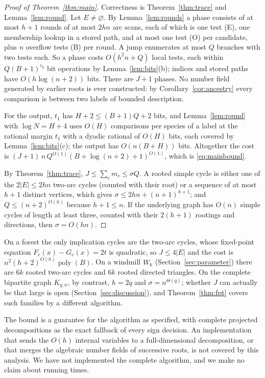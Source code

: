 \documentclass[11pt,a4paper]{article}
\theoremstyle{plain}
\theoremstyle{definition}
\theoremstyle{remark}
\newcommand{\poly}{\operatorname{poly}}
\begin{document}
\begin{proof}[Proof of Theorem~\ref{thm:main}]
Correctness is Theorem~\ref{thm:trace} and Lemma~\ref{lem:round}. Let $E\ne\varnothing$. By Lemma~\ref{lem:rounds} a phase consists of at most $h+1$ rounds of at most $2hn$ arc scans, each of which is one test (E), one membership lookup in a stored path, and at most one test (O) per candidate, plus $n$ overflow tests (B) per round. A jump enumerates at most $Q$ branches with two tests each. So a phase costs $O(h^2n+Q)$ local tests, each within $Q(B+1)^{c_0}$ bit operations by Lemma~\ref{lem:bits}(b); indices and stored paths have $O(h\log(n+2))$ bits. There are $J+1$ phases. No number field generated by earlier roots is ever constructed: by Corollary~\ref{cor:ancestry} every comparison is between two labels of bounded description.

For the output, $t_1$ has $H+2\le(B+1)Q+2$ bits, and Lemma~\ref{lem:round} with $\log N=H+4$ uses $O(H)$ comparisons per species of a label at the rational margin $t_1$ with a dyadic rational of $O(H)$ bits, each covered by Lemma~\ref{lem:bits}(c); the output has $O(n(B+H))$ bits. Altogether the cost is $(J+1)\,n\,Q^{O(1)}(B+\log(n+2)+1)^{O(1)}$, which is \eqref{eq:mainbound}.

By Theorem~\ref{thm:trace}, $J\le\sum_cm_c\le\sigma Q$. A rooted simple cycle is either one of the $2|E|\le2hn$ two-arc cycles (counted with their root) or a sequence of at most $h+1$ distinct vertices, which gives $\sigma\le2hn+(n+1)^{h+1}$; and $Q\le(n+2)^{O(h)}$ because $h+1\le n$. If the underlying graph has $O(n)$ simple cycles of length at least three, counted with their $2(h+1)$ rootings and directions, then $\sigma=O(hn)$.
\end{proof}

On a forest the only implication cycles are the two-arc cycles, whose fixed-point equation $F_e(x)-G_e(x)=2t$ is quadratic, so $J\le4|E|$ and the cost is $n^2(h+2)^{O(h)}\poly(B)$. On a windmill $W_k$ (Section~\ref{sec:parameter}) there are $6k$ rooted two-arc cycles and $6k$ rooted directed triangles. On the complete bipartite graph $K_{q,n}$, by contrast, $h=2q$ and $\sigma=n^{\Theta(q)}$; whether $J$ can actually be that large is open (Section~\ref{sec:discussion}), and Theorem~\ref{thm:fpt} covers such families by a different algorithm.

The bound is a guarantee for the algorithm as specified, with complete projected decompositions as the exact fallback of every sign decision. An implementation that sends the $O(h)$ internal variables to a full-dimensional decomposition, or that merges the algebraic number fields of successive roots, is not covered by this analysis. We have not implemented the complete algorithm, and we make no claim about running times.
\end{document}

